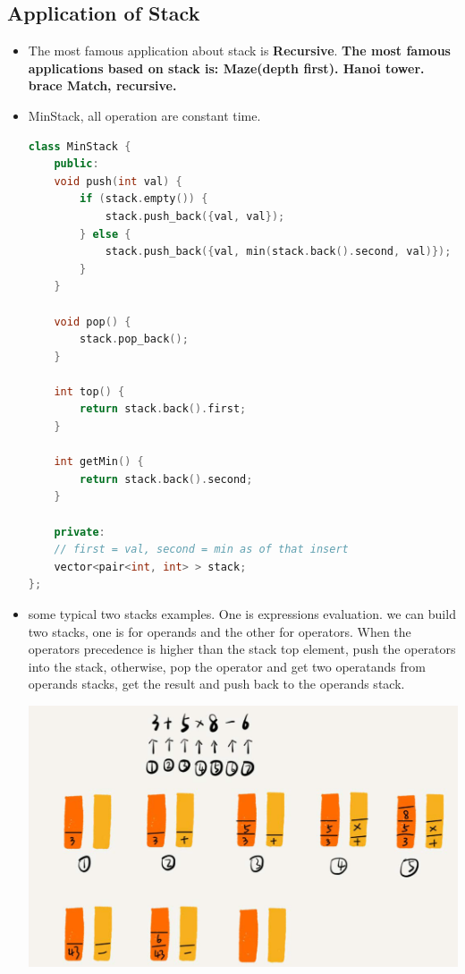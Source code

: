 \documentclass[a4paper,11pt,twoside]{book}
\begin{document}
\subsection{Application of Stack}
\begin{itemize}
		
\item The most famous application about stack is \textbf{Recursive}. \textbf{The most famous applications based on stack is:  Maze(depth first). Hanoi tower. brace Match, recursive.}  


\item MinStack, all operation are constant time.
\begin{lstlisting}[frame=single, language=c++, basicstyle=\scriptsize]
class MinStack {
	public:
	void push(int val) {
		if (stack.empty()) {
			stack.push_back({val, val});
		} else {
			stack.push_back({val, min(stack.back().second, val)});
		}
	}
	
	void pop() {
		stack.pop_back();
	}
	
	int top() {
		return stack.back().first;
	}
	
	int getMin() {
		return stack.back().second;
	}
	
	private:
	// first = val, second = min as of that insert
	vector<pair<int, int> > stack;
};
\end{lstlisting}

	\item some typical two stacks examples. One is expressions evaluation. we can build two stacks, one is for operands and the other for operators. When the operators precedence is higher than the stack top element, push the operators into the stack, otherwise, pop the operator and get two operatands from operands stacks, get the result and push back to the operands stack.  
	\begin{center}
			\includegraphics[scale=0.45]{pics/stacks_two.png} 
	\end{center}


\end{itemize}
\end{document}
